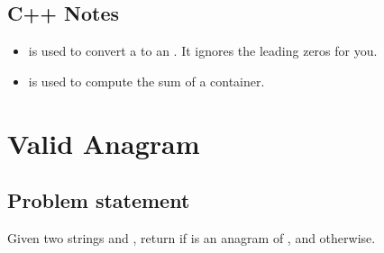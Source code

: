 \documentclass[letterpaper,12pt,english]{book}
\begin{document}
\subsection{C++ Notes}
\label{\detokenize{String/08_STR_165_Compare_Version_Numbers:c-notes}}\begin{itemize}
\item {} 
\sphinxAtStartPar
{}%
\begin{footnote}[26]\sphinxAtStartFootnote
{}
%
\end{footnote} is used to convert a  to an . It ignores the leading zeros for you.

\item {} 
\sphinxAtStartPar
{}%
\begin{footnote}[27]\sphinxAtStartFootnote
{}
%
\end{footnote} is used to compute the sum of a container.

\end{itemize}

\sphinxstepscope


\section{Valid Anagram}
\label{\detokenize{String/08_STR_242_Valid_Anagram:valid-anagram}}\label{\detokenize{String/08_STR_242_Valid_Anagram::doc}}

\subsection{Problem statement\sphinxfootnotemark[28]}
\label{\detokenize{String/08_STR_242_Valid_Anagram:problem-statement}}%
\begin{footnotetext}[28]\sphinxAtStartFootnote
{}
%
\end{footnotetext}\ignorespaces 
\sphinxAtStartPar
Given two strings  and , return  if  is an anagram of , and  otherwise.
\end{document}
